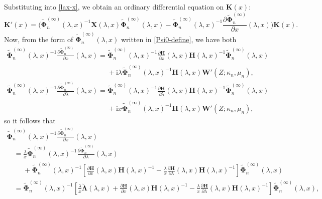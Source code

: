 \documentclass[11pt]{article}
\numberwithin{equation}{section}
\numberwithin{equation}{section}
\newcommand{\ii}{\mathrm{i}}
\begin{document}
Substituting into \eqref{lax-x}, we obtain an ordinary differential equation on $\mathbf{K}(x)$:
\begin{equation}
 \mathbf{K}'(x)=\bigg(\widetilde{\boldsymbol\Phi}_n^{(\infty)}(\lambda,x)^{-1}\mathbf{X}(\lambda,x)\widetilde{\boldsymbol\Phi}_n^{(\infty)}(\lambda,x)-
 \widetilde{\boldsymbol\Phi}_n^{(\infty)}(\lambda,x)^{-1}\frac{\partial\widetilde{\boldsymbol\Phi}_{n}^{(\infty)}}{\partial x}(\lambda,x)\bigg)\mathbf{K}(x).
 \label{K-ODE}
\end{equation}
Now, from the form of $\widetilde{\boldsymbol\Phi}_n^{(\infty)}(\lambda,x)$ written in \eqref{Psi0-define}, we have both
\begin{gather*}
 \widetilde{\boldsymbol{\Phi}}_n^{(\infty)}(\lambda,x)^{-1}\frac{\partial\widetilde{\boldsymbol\Phi}_{n}^{(\infty)}}{\partial x}(\lambda,x)=\widetilde{\boldsymbol{\Phi}}_n^{(\infty)}(\lambda,x)^{-1}\frac{\partial\mathbf{H}}{\partial x}(\lambda,x)\mathbf{H}(\lambda,x)^{-1}\widetilde{\boldsymbol\Phi}_n^{(\infty)}(\lambda,x) \\
\phantom{ \widetilde{\boldsymbol{\Phi}}_n^{(\infty)}(\lambda,x)^{-1}\frac{\partial\widetilde{\boldsymbol\Phi}_{n}^{(\infty)}}{\partial x}(\lambda,x)=}{}+ \ii\lambda\widetilde{\boldsymbol\Phi}_n^{(\infty)}(\lambda,x)^{-1}\mathbf{H}(\lambda,x)\mathbf{W}'(Z;\kappa_n,\mu_n),\\
 \widetilde{\boldsymbol{\Phi}}_n^{(\infty)}(\lambda,x)^{-1}\frac{\partial\widetilde{\boldsymbol\Phi}_{n}^{(\infty)}}{\partial\lambda}(\lambda,x)=\widetilde{\boldsymbol{\Phi}}_n^{(\infty)}(\lambda,x)^{-1}\frac{\partial\mathbf{H}}{\partial\lambda}(\lambda,x)\mathbf{H}(\lambda,x)^{-1}\widetilde{\boldsymbol\Phi}_n^{(\infty)}(\lambda,x) \\
\phantom{ \widetilde{\boldsymbol{\Phi}}_n^{(\infty)}(\lambda,x)^{-1}\frac{\partial\widetilde{\boldsymbol\Phi}_{n}^{(\infty)}}{\partial\lambda}(\lambda,x)=}{}+ \ii x\widetilde{\boldsymbol\Phi}_n^{(\infty)}(\lambda,x)^{-1}\mathbf{H}(\lambda,x)\mathbf{W}'(Z;\kappa_n,\mu_n),
\end{gather*}
so it follows that
\begin{gather*}
 \widetilde{\boldsymbol{\Phi}}_n^{(\infty)}(\lambda,x)^{-1}\frac{\partial\widetilde{\boldsymbol\Phi}_{n}^{(\infty)}}{\partial x}(\lambda,x)\\
\quad=\frac{\lambda}{x}\widetilde{\boldsymbol{\Phi}}_n^{(\infty)}(\lambda,x)^{-1}\frac{\partial\widetilde{\boldsymbol{\Phi}}_{n}^{(\infty)}}{\partial\lambda}(\lambda,x)\\
 \quad\phantom{=}{}+ \widetilde{\boldsymbol{\Phi}}_n^{(\infty)}(\lambda,x)^{-1}\left[\frac{\partial\mathbf{H}}{\partial x}(\lambda,x)\mathbf{H}(\lambda,x)^{-1}-\frac{\lambda}{x}\frac{\partial\mathbf{H}}{\partial\lambda}(\lambda,x)\mathbf{H}(\lambda,x)^{-1}\right]\widetilde{\boldsymbol{\Phi}}_n^{(\infty)}(\lambda,x)\\
 \quad=\widetilde{\boldsymbol{\Phi}}_n^{(\infty)}(\lambda,x)^{-1}\left[\frac{\lambda}{x}\breve{\boldsymbol\Lambda}(\lambda,x) + \frac{\partial\mathbf{H}}{\partial x}(\lambda,x)\mathbf{H}(\lambda,x)^{-1}-\frac{\lambda}{x}\frac{\partial\mathbf{H}}{\partial\lambda}(\lambda,x)\mathbf{H}(\lambda,x)^{-1}\right]\widetilde{\boldsymbol{\Phi}}_n^{(\infty)}(\lambda,x),
\end{gather*}
\end{document}
